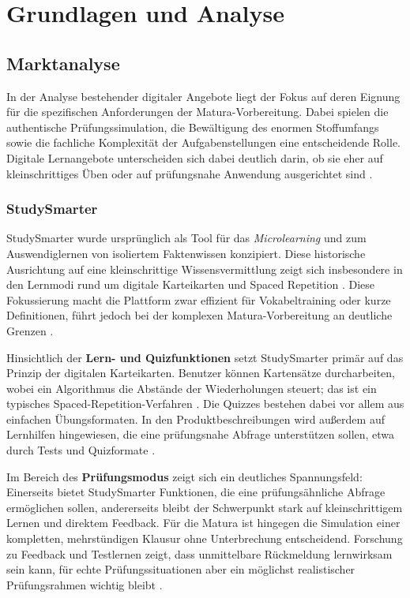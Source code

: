 \section{Grundlagen und Analyse}
\setauthor{\secondauthor}

\subsection{Marktanalyse}
In der Analyse bestehender digitaler Angebote liegt der Fokus auf deren Eignung für die spezifischen Anforderungen der Matura-Vorbereitung. Dabei spielen die authentische Prüfungssimulation, die Bewältigung des enormen Stoffumfangs sowie die fachliche Komplexität der Aufgabenstellungen eine entscheidende Rolle. Digitale Lernangebote unterscheiden sich dabei deutlich darin, ob sie eher auf kleinschrittiges Üben oder auf prüfungsnahe Anwendung ausgerichtet sind \cite{StudySmarterSpacedRepetition}.

\subsubsection{StudySmarter}
StudySmarter wurde ursprünglich als Tool für das \textit{Microlearning} und zum Auswendiglernen von isoliertem Faktenwissen konzipiert. Diese historische Ausrichtung auf eine kleinschrittige Wissensvermittlung zeigt sich insbesondere in den Lernmodi rund um digitale Karteikarten und Spaced Repetition \cite{StudySmarterSpacedRepetition}. Diese Fokussierung macht die Plattform zwar effizient für Vokabeltraining oder kurze Definitionen, führt jedoch bei der komplexen Matura-Vorbereitung an deutliche Grenzen \cite{StudySmarterSpacedRepetition} \cite{StudySmarterFeatures}.

Hinsichtlich der \textbf{Lern- und Quizfunktionen} setzt StudySmarter primär auf das Prinzip der digitalen Karteikarten. Benutzer können Kartensätze durcharbeiten, wobei ein Algorithmus die Abstände der Wiederholungen steuert; das ist ein typisches Spaced-Repetition-Verfahren \cite{StudySmarterSpacedRepetition}. Die Quizzes bestehen dabei vor allem aus einfachen Übungsformaten. In den Produktbeschreibungen wird außerdem auf Lernhilfen hingewiesen, die eine prüfungsnahe Abfrage unterstützen sollen, etwa durch Tests und Quizformate \cite{StudySmarterFeatures}.

Im Bereich des \textbf{Prüfungsmodus} zeigt sich ein deutliches Spannungsfeld: Einerseits bietet StudySmarter Funktionen, die eine prüfungsähnliche Abfrage ermöglichen sollen, andererseits bleibt der Schwerpunkt stark auf kleinschrittigem Lernen und direktem Feedback. Für die Matura ist hingegen die Simulation einer kompletten, mehrstündigen Klausur ohne Unterbrechung entscheidend. Forschung zu Feedback und Testlernen zeigt, dass unmittelbare Rückmeldung lernwirksam sein kann, für echte Prüfungssituationen aber ein möglichst realistischer Prüfungsrahmen wichtig bleibt \cite{FeedbackTimeMultimediaLearning}.


